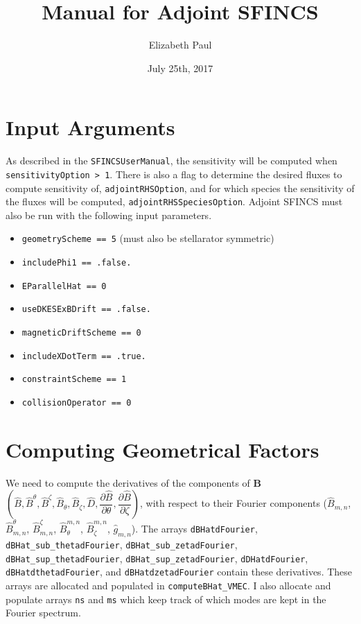 \documentclass[11pt]{amsart}
\newcommand{\partder}[2]{\dfrac{\partial #1}{\partial #2}} %
\begin{document}
\author{Elizabeth Paul}
\date{July 25th, 2017}
\title{Manual for Adjoint SFINCS}
\maketitle

\section{Input Arguments}
As described in the \texttt{SFINCSUserManual}, the sensitivity will be computed when \texttt{sensitivityOption > 1}. There is also a flag to determine the desired fluxes to compute sensitivity of, \texttt{adjointRHSOption}, and for which species the sensitivity of the fluxes will be computed, \texttt{adjointRHSSpeciesOption}. Adjoint SFINCS must also be run with the following input parameters. 
\begin{itemize}
\item \texttt{geometryScheme == 5} (must also be stellarator symmetric)
\item \texttt{includePhi1 == .false.}
\item \texttt{EParallelHat == 0}
\item \texttt{useDKESExBDrift == .false.} 
\item \texttt{magneticDriftScheme == 0}
\item \texttt{includeXDotTerm == .true.} 
\item \texttt{constraintScheme == 1}
\item \texttt{collisionOperator == 0}
\end{itemize}

\section{Computing Geometrical Factors}
We need to compute the derivatives of the components of $\bm{B}$ $\left( \hat{B}, \hat{B}^{\theta}, \hat{B}^{\zeta}, \hat{B}_{\theta}, \hat{B}_{\zeta}, \hat{D}, \partder{\hat{B}}{\theta}, \partder{\hat{B}}{\zeta} \right)$, with respect to their Fourier components ($\hat{B}_{m,n}$, $\hat{B}_{m,n}^{\theta}$, $\hat{B}_{m,n}^{\zeta}$, $\hat{B}^{m,n}_{\theta}$, $\hat{B}^{m,n}_{\zeta}$, $\hat{g}_{m,n}$). The arrays \texttt{dBHatdFourier}, \texttt{dBHat_sub_thetadFourier}, \texttt{dBHat_sub_zetadFourier}, \texttt{dBHat_sup_thetadFourier}, \texttt{dBHat_sup_zetadFourier}, \texttt{dDHatdFourier}, \texttt{dBHatdthetadFourier}, and \texttt{dBHatdzetadFourier} contain these derivatives. These arrays are allocated and populated in \texttt{computeBHat_VMEC}. I also allocate and populate arrays \texttt{ns} and \texttt{ms} which keep track of which modes are kept in the Fourier spectrum. 
\end{document}
